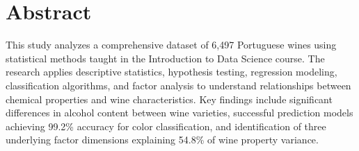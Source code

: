\chapter*{Abstract}

This study analyzes a comprehensive dataset of 6,497 Portuguese wines using statistical methods taught in the Introduction to Data Science course. The research applies descriptive statistics, hypothesis testing, regression modeling, classification algorithms, and factor analysis to understand relationships between chemical properties and wine characteristics. Key findings include significant differences in alcohol content between wine varieties, successful prediction models achieving 99.2\% accuracy for color classification, and identification of three underlying factor dimensions explaining 54.8\% of wine property variance.